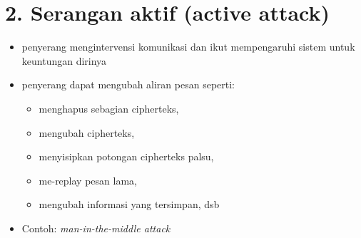 \documentclass{article}
\begin{document}

\section*{2. Serangan aktif (active attack)}

\begin{itemize}
    \item penyerang mengintervensi komunikasi dan ikut mempengaruhi sistem untuk keuntungan dirinya
    \item penyerang dapat mengubah aliran pesan seperti:
    \begin{itemize}
        \item menghapus sebagian cipherteks,
        \item mengubah cipherteks,
        \item menyisipkan potongan cipherteks palsu,
        \item me-replay pesan lama,
        \item mengubah informasi yang tersimpan, dsb
    \end{itemize}
    \item Contoh: \textit{man-in-the-middle attack}
\end{itemize}
\end{document}
